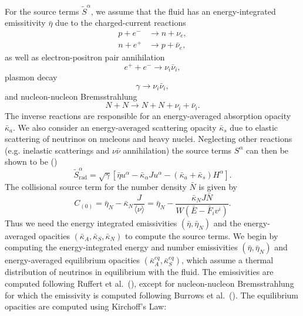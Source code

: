 For the source terms $\tilde{S}^\alpha$, we assume that the fluid has an energy-integrated emissitivity $\bar \eta$ due to the charged-current reactions
%
\begin{align}
  p + e^- &\rightarrow n + \nu_e, \\
  n + e^+ &\rightarrow p + \bar{\nu}_e,
\end{align}
%
as well as electron-positron pair annihilation
%
\begin{equation}
  e^+ + e^- \rightarrow \nu_i \bar \nu_i,
\end{equation}
%
plasmon decay
%
\begin{equation}
  \gamma \rightarrow \nu_i\bar \nu_i,
\end{equation}
%
and nucleon-nucleon Bremsstrahlung
%
\begin{equation}
  N + N \rightarrow N + N + \nu_i + \bar \nu_i.
\end{equation}
%
The inverse reactions are responsible for an energy-averaged absorption opacity $\bar \kappa_a$. We also consider an energy-averaged scattering opacity $\bar \kappa_s$ due to elastic scattering of neutrinos on nucleons and heavy nuclei. Neglecting other reactions (e.g. inelastic scatterings and $\nu\bar\nu$ annihilation) the source terms $S^\alpha$ can then be shown to be (\citet*{shibata2011truncated})
%
\begin{equation}
  \tilde S_\text{rad}^\alpha = \sqrt{\gamma} [\bar \eta u^\alpha - \bar \kappa_\alpha J u^\alpha - (\bar \kappa_a + \bar \kappa_s) H^\alpha].
\end{equation}
%
The collisional source term for the number density $\bar N$ is given by
%
\begin{equation}
  C_{(0)} = \bar \eta_N - \bar \kappa_N \frac{J}{\langle\nu\rangle} = \bar \eta_N - \frac{\bar \kappa_N J \bar N}{W(\bar E - \bar F_iv^i)}.
\end{equation}
%
Thus we need the energy integrated emissivities $(\bar \eta, \bar \eta_N)$ and the energy-averaged opacities $(\bar \kappa_A, \bar \kappa_S, \bar \kappa_N)$ to compute the source terms. 
We begin by computing the energy-integrated energy and number emissivities $(\bar \eta, \bar \eta_N)$ and energy-averaged equilibrium opacities $(\bar \kappa^{eq}_A, \bar \kappa^{eq}_S)$, which assume a thermal distribution of neutrinos in equilibrium with the fluid. The emissivities are computed following Ruffert et al.~(\citet*{ruffert1996}), except for nucleon-nucleon Bremsstrahlung for which the emissivity is computed following Burrows et al.~(\citet*{burrows2006b}). The equilibrium opacities are computed using Kirchoff's Law:
